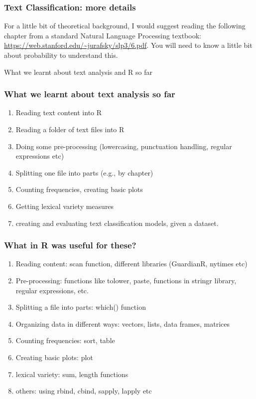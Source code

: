 \documentclass{beamer}
\begin{document}
\begin{frame}
\frametitle{Text Classification: more details}
For a little bit of theoretical background, I would suggest reading the following chapter from a standard Natural Language Processing textbook: \url{https://web.stanford.edu/~jurafsky/slp3/6.pdf}. You will need to know a little bit about probability to understand this.
\end{frame}

\begin{frame}
\centering \Large What we learnt about text analysis and R so far
\end{frame}

\begin{frame}
\frametitle{What we learnt about text analysis so far}
\begin{enumerate}
\item Reading text content into R
\item Reading a folder of text files into R \pause
\item Doing some pre-processing (lowercasing, punctuation handling, regular expressions etc)
\item Splitting one file into parts (e.g., by chapter) \pause
\item Counting frequencies, creating basic plots
\item Getting lexical variety measures \pause
\item creating and evaluating text classification models, given a dataset. 
\end{enumerate}
\end{frame}

\begin{frame}
\frametitle{What in R was useful for these?}
\begin{enumerate}
\item Reading content: scan function, different libraries (GuardianR, nytimes etc) \pause
\item Pre-processing: functions like tolower, paste, functions in stringr library, regular expressions, etc. \pause
\item Splitting a file into parts: which() function 
\item Organizing data in different ways: vectors, lists, data frames, matrices \pause
\item Counting frequencies: sort, table
\item Creating basic plots: plot \pause
\item lexical variety: sum, length functions
\item others: using rbind, cbind, sapply, lapply etc
\end{enumerate}
\end{frame}
\end{document}
